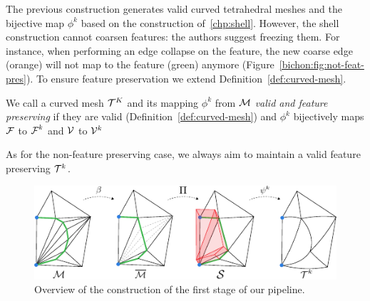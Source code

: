 The previous construction generates valid curved tetrahedral meshes and the bijective map $\phi^k$ based on the construction of~\ref{chp:shell}. However, the shell construction cannot coarsen features{:} the authors suggest {freezing} them. For instance, when performing an edge collapse on the feature, the new coarse edge (orange) will not map to the feature (green) anymore (Figure~\ref{bichon:fig:not-feat-pres}). 
To ensure feature preservation we extend Definition~\ref{def:curved-mesh}.
\begin{definition}\label{def:curved-features}
We call a curved mesh $\mathcal{T}^K$ and its mapping $\phi^k$ from $\mathcal{M}$ \emph{valid and feature preserving} if they are valid (Definition~\ref{def:curved-mesh}) and $\phi^k$ bijectively maps $\operatorname{\mathcal{F}}$ to $\operatorname{\mathcal{F}}^k$ and $\mathcal{V}$ to $\mathcal{V}^k$
\end{definition}
As for the non-feature preserving case, we always aim to maintain a valid feature preserving $\mathcal{T}^k$.


\begin{figure}
    \centering
    \includegraphics[width=\linewidth]{curve_meshing_in_shell_tex/figs/illustrations/stage-1.pdf}
    \caption{Overview of the construction of the first stage of our pipeline.}
    \label{bichon:fig:stage-1}
\end{figure}

